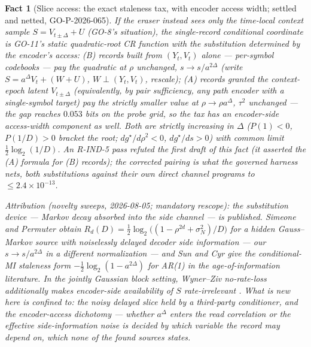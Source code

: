 ﻿\documentclass[11pt]{article}
\newtheorem{fact}{Fact}
\theoremstyle{remark}
\begin{document}
\begin{fact}[Slice access: the exact staleness tax, with encoder access
width; settled and netted, GO-P-2026-065]\label{lem:slice}
If the eraser instead sees only the time-local context sample
$S=V_{t\pm\Delta}+U$ (GO-8's situation), the single-record conditional
coordinate is GO-11's static quadratic-root CR function with the
substitution determined by the \emph{encoder's} access:
(B) records built from $(Y_t,V_t)$ alone --- per-symbol codebooks ---
pay the quadratic at $\rho$ unchanged, $s\to s/a^{2\Delta}$
(write $S=a^\Delta V_t+(W+U)$, $W\perp(Y_t,V_t)$, rescale); (A) records
granted the context-epoch latent $V_{t\pm\Delta}$ (equivalently, by
pair sufficiency, any path encoder with a single-symbol target) pay the
strictly smaller value at $\rho\to\rho a^\Delta$, $\tau^2$ unchanged
--- the gap reaches $0.053$ bits on the probe grid, so the tax has an
encoder-side access-width component as well. Both are strictly
increasing in $\Delta$ ($P(1)<0$, $P(1/D)>0$ bracket the root;
$dg^\star/d\rho^2<0$, $dg^\star/ds>0$) with common limit
$\tfrac12\log_2(1/D)$. An R-IND-5 pass refuted the first draft of this
fact (it asserted the (A) formula for (B) records); the corrected
pairing is what the governed harness nets, both substitutions against
their own direct channel programs to $\le2.4\times10^{-13}$.

\emph{Attribution} (novelty sweeps, 2026-08-05; mandatory rescope): the
substitution \emph{device} --- Markov decay absorbed into the side
channel --- is published. Simeone and Permuter
\cite[Eq.~(49), test channel Eq.~(67)]{simeonepermuter} obtain
$R_d(D)=\tfrac12\log_2\!\bigl((1-\rho^{2d}+\sigma_N^2)/D\bigr)$ for a
hidden Gauss--Markov source with noiselessly delayed decoder side
information --- our $s\to s/a^{2\Delta}$ in a different normalization
--- and Sun and Cyr \cite[Eq.~(7)]{suncyr} give the conditional-MI
staleness form $-\tfrac12\log_2(1-a^{2\Delta})$ for AR(1) in the
age-of-information literature. In the jointly Gaussian block setting,
Wyner--Ziv no-rate-loss additionally makes encoder-side availability of
$S$ rate-irrelevant \cite{wynerziv}. What is new here is confined to:
the noisy delayed slice held by a \emph{third-party} conditioner, and
the \emph{encoder-access dichotomy} --- whether $a^\Delta$ enters the
read correlation or the effective side-information noise is decided by
which variable the record may depend on, which none of the found
sources states.
\end{fact}
\end{document}
